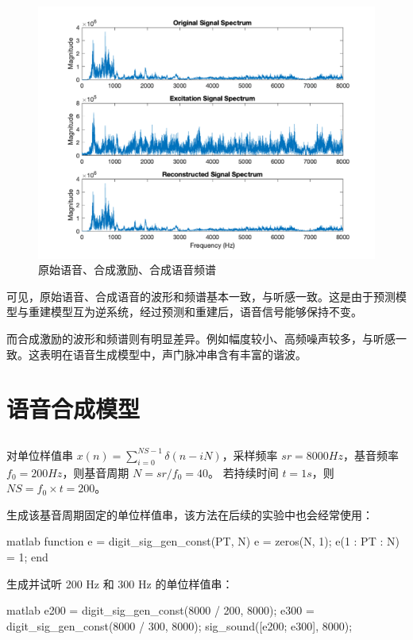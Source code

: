 \documentclass[a4paper]{article}  %
\begin{document}
\begin{figure}[ht]
    \centering
    \includegraphics[width=.6\textwidth]{asserts/1_6_signal_f.png}
    \caption{
        原始语音、合成激励、合成语音频谱
    }\label{fig:1_6_signal_f}
\end{figure}

可见，原始语音、合成语音的波形和频谱基本一致，与听感一致。这是由于预测模型与重建模型互为逆系统，经过预测和重建后，语音信号能够保持不变。

而合成激励的波形和频谱则有明显差异。例如幅度较小、高频噪声较多，与听感一致。这表明在语音生成模型中，声门脉冲串含有丰富的谐波。


\section{语音合成模型}

\subsection{}

对单位样值串 $x(n) = \sum_{i=0}^{NS-1}\delta(n-iN)$，采样频率 $sr = 8000 Hz$，基音频率 $f_0 = 200 Hz$，则基音周期 $N = sr / f_0 = 40$。
若持续时间 $t = 1s$，则 $NS = f_0 \times t = 200$。

生成该基音周期固定的单位样值串，该方法在后续的实验中也会经常使用：
\begin{codeblock}{matlab}
function e = digit_sig_gen_const(PT, N)
    e = zeros(N, 1);
    e(1 : PT : N) = 1;
end
\end{codeblock}

生成并试听 200 Hz 和 300 Hz 的单位样值串：
\begin{codeblock}{matlab}
e200 = digit_sig_gen_const(8000 / 200, 8000);
e300 = digit_sig_gen_const(8000 / 300, 8000);
sig_sound([e200; e300], 8000);
\end{codeblock}
\end{document}
